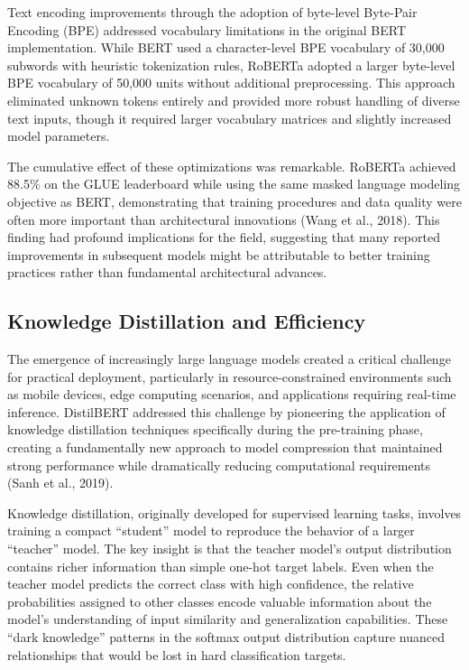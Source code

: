 \documentclass[
  titlepage]{article}
\begin{document}
Text encoding improvements through the adoption of byte-level Byte-Pair
Encoding (BPE) addressed vocabulary limitations in the original BERT
implementation. While BERT used a character-level BPE vocabulary of
30,000 subwords with heuristic tokenization rules, RoBERTa adopted a
larger byte-level BPE vocabulary of 50,000 units without additional
preprocessing. This approach eliminated unknown tokens entirely and
provided more robust handling of diverse text inputs, though it required
larger vocabulary matrices and slightly increased model parameters.

The cumulative effect of these optimizations was remarkable. RoBERTa
achieved 88.5\% on the GLUE leaderboard while using the same masked
language modeling objective as BERT, demonstrating that training
procedures and data quality were often more important than architectural
innovations (Wang et al., 2018). This finding had profound implications
for the field, suggesting that many reported improvements in subsequent
models might be attributable to better training practices rather than
fundamental architectural advances.

\subsection{Knowledge Distillation and
Efficiency}\label{knowledge-distillation-and-efficiency}

The emergence of increasingly large language models created a critical
challenge for practical deployment, particularly in resource-constrained
environments such as mobile devices, edge computing scenarios, and
applications requiring real-time inference. DistilBERT addressed this
challenge by pioneering the application of knowledge distillation
techniques specifically during the pre-training phase, creating a
fundamentally new approach to model compression that maintained strong
performance while dramatically reducing computational requirements (Sanh
et al., 2019).

Knowledge distillation, originally developed for supervised learning
tasks, involves training a compact ``student'' model to reproduce the
behavior of a larger ``teacher'' model. The key insight is that the
teacher model's output distribution contains richer information than
simple one-hot target labels. Even when the teacher model predicts the
correct class with high confidence, the relative probabilities assigned
to other classes encode valuable information about the model's
understanding of input similarity and generalization capabilities. These
``dark knowledge'' patterns in the softmax output distribution capture
nuanced relationships that would be lost in hard classification targets.
\end{document}
